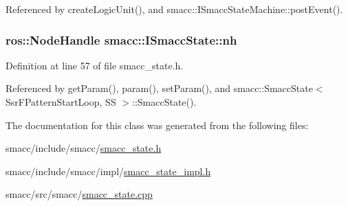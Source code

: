 Referenced by create\+Logic\+Unit(), and smacc\+::\+I\+Smacc\+State\+Machine\+::post\+Event().

\subsubsection[{\texorpdfstring{nh}{nh}}]{\setlength{\rightskip}{0pt plus 5cm}ros\+::\+Node\+Handle smacc\+::\+I\+Smacc\+State\+::nh}\hypertarget{classsmacc_1_1ISmaccState_a13fe6e6abfdb87996402189d44b78494}{}\label{classsmacc_1_1ISmaccState_a13fe6e6abfdb87996402189d44b78494}


Definition at line 57 of file smacc\+\_\+state.\+h.



Referenced by get\+Param(), param(), set\+Param(), and smacc\+::\+Smacc\+State$<$ Ssr\+F\+Pattern\+Start\+Loop, S\+S $>$\+::\+Smacc\+State().



The documentation for this class was generated from the following files\+:\begin{DoxyCompactItemize}
\item 
smacc/include/smacc/\hyperlink{smacc__state_8h}{smacc\+\_\+state.\+h}\item 
smacc/include/smacc/impl/\hyperlink{smacc__state__impl_8h}{smacc\+\_\+state\+\_\+impl.\+h}\item 
smacc/src/smacc/\hyperlink{smacc__state_8cpp}{smacc\+\_\+state.\+cpp}\end{DoxyCompactItemize}
